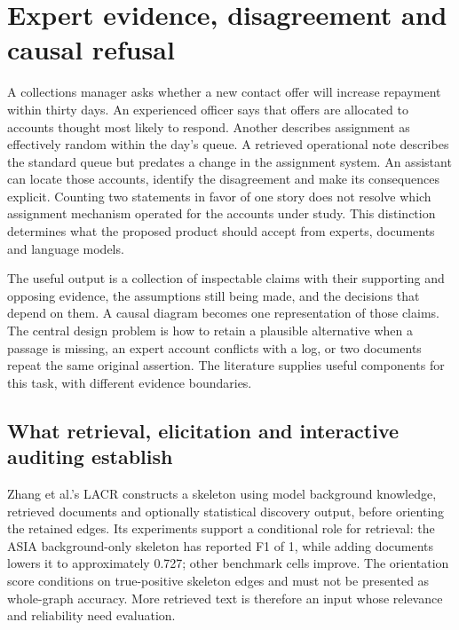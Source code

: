 \hypertarget{expert-evidence-disagreement-and-causal-refusal}{%
\section{Expert evidence, disagreement and causal
refusal}\label{expert-evidence-disagreement-and-causal-refusal}}

\label{exec14:expert-evidence}

A collections manager asks whether a new contact offer will increase
repayment within thirty days. An experienced officer says that offers
are allocated to accounts thought most likely to respond. Another
describes assignment as effectively random within the day's queue. A
retrieved operational note describes the standard queue but predates a
change in the assignment system. An assistant can locate those accounts,
identify the disagreement and make its consequences explicit. Counting
two statements in favor of one story does not resolve which assignment
mechanism operated for the accounts under study. This distinction
determines what the proposed product should accept from experts,
documents and language models.

The useful output is a collection of inspectable claims with their
supporting and opposing evidence, the assumptions still being made, and
the decisions that depend on them. A causal diagram becomes one
representation of those claims. The central design problem is how to
retain a plausible alternative when a passage is missing, an expert
account conflicts with a log, or two documents repeat the same original
assertion. The literature supplies useful components for this task, with
different evidence boundaries.

\hypertarget{what-retrieval-elicitation-and-interactive-auditing-establish}{%
\subsection{What retrieval, elicitation and interactive auditing
establish}\label{what-retrieval-elicitation-and-interactive-auditing-establish}}

Zhang et al.'s LACR constructs a skeleton using model background
knowledge, retrieved documents and optionally statistical discovery
output, before orienting the retained edges. Its experiments support a
conditional role for retrieval: the ASIA background-only skeleton has
reported F1 of 1, while adding documents lowers it to approximately
0.727; other benchmark cells improve. The orientation score conditions
on true-positive skeleton edges and must not be presented as whole-graph
accuracy. More retrieved text is therefore an input whose relevance and
reliability need evaluation. \citep{v12_la_2402_15301}

